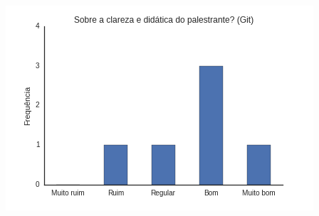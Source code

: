\documentclass[12pt]{article}
\begin{document}
\begin{center}
    \includegraphics[height=0.25\textheight]{images/git3.png}
\end{center}
\end{document}
